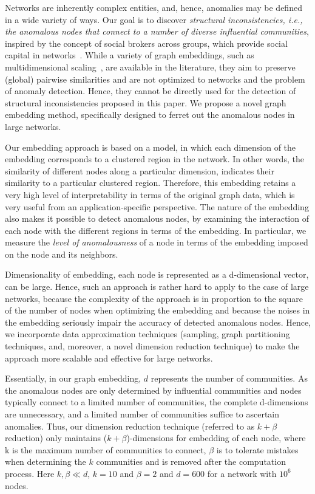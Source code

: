 Networks are inherently complex entities, and, hence, anomalies may be defined in a wide variety of ways.
Our goal is to discover {\em  structural inconsistencies, i.e.,  the anomalous nodes that connect to a number of diverse influential communities}, inspired by the concept of social brokers across groups, which provide social capital in networks~\cite{s-hole04}.
While a variety of graph embeddings, such as multidimensional scaling~\cite{mds}, are available in the literature, they aim to preserve (global) pairwise similarities and are not optimized to networks and the problem of anomaly detection.
Hence, they cannot be directly used for the detection of structural inconsistencies proposed in this paper. We propose a novel graph embedding method, specifically designed to ferret out the anomalous nodes in large networks.


Our embedding approach is  based on a model, in which each dimension of the embedding corresponds to a clustered region in the network.
In other words, the similarity of different nodes along a particular dimension, indicates their similarity to a particular clustered region.
Therefore, this embedding retains a very high level of interpretability in  terms of the original graph data, which is very useful from an application-specific perspective. The nature of  the embedding also  makes it  possible  to detect anomalous nodes, by examining the interaction of each node with the different regions in terms of the embedding. In particular, we measure the {\em level of anomalousness} of a node in terms of the embedding imposed on the node and its neighbors.


Dimensionality of embedding, each node is represented as a d-dimensional vector, can be large. Hence, such an approach is rather hard to apply to the case of large networks, because the complexity of the approach is in proportion to the square of the number of nodes when optimizing the embedding and because the noises in the embedding seriously impair the accuracy of detected anomalous nodes. Hence, we incorporate data approximation techniques (sampling, graph partitioning techniques, and, moreover, a novel dimension reduction technique) to make the approach more scalable and effective for large networks.

Essentially, in our graph embedding, $d$ represents the number of communities. As the anomalous nodes are only determined by influential communities and nodes typically connect to a limited number of communities, the complete d-dimensions are unnecessary, and a limited number of communities suffice to ascertain anomalies. Thus, our dimension reduction technique (referred to as $k+\beta$ reduction) only maintains ($k + \beta$)-dimensions for embedding of each node, where k is the maximum number of communities to connect, $\beta$ is to tolerate mistakes when determining the $k$ communities and is removed after the computation process. Here $k, \beta \ll d$, \eg $k = 10$ and $\beta = 2$ and $d=600$ for a network with $10^6$ nodes.



